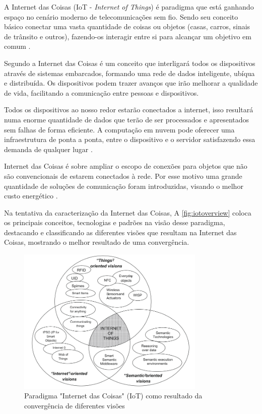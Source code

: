 A Internet das Coisas (IoT - \textit{Internet of Things}) é paradigma que está ganhando espaço no cenário moderno de telecomunicações sem fio. Sendo seu conceito básico conectar uma vasta quantidade de coisas ou objetos (casas, carros, sinais de trânsito e outros), fazendo-os interagir entre si para alcançar um objetivo em comum \cite{atzori2010internet}.


Segundo \cite{xia:2012} a Internet das Coisas é um conceito que interligará todos os dispositivos através de sistemas embarcados, formando uma rede de dados inteligente, ubíqua e distribuída. Os dispositivos podem trazer avanços que irão melhorar a qualidade de vida, facilitando a comunicação entre pessoas e dispositivos.

Todos os dispositivos ao nosso redor estarão conectados a internet, isso resultará numa enorme quantidade de dados que terão de ser processados e apresentados sem falhas de forma eficiente. A computação em nuvem pode oferecer uma infraestrutura de ponta a ponta, entre o dispositivo e o servidor satisfazendo essa demanda de qualquer lugar \cite{Gubbi:2013}.

Internet das Coisas é sobre ampliar o escopo de conexões para objetos que não são convencionais de estarem conectados à rede. Por esse motivo uma grande quantidade de soluções de comunicação foram introduzidas, visando o melhor custo energético \cite{siekkinen2012low}. 

Na tentativa da caracterização da Internet das Coisas, A \autoref{fig:iotoverview} coloca os principais conceitos, tecnologias e padrões na visão desse paradigma, destacando e classificando as diferentes visões que resultam na Internet das Coisas, mostrando o melhor resultado de uma convergência.

 \begin{figure}[H]
	\centering
    	\caption{\label{fig:iotoverview} Paradigma "Internet das Coisas" (IoT) como resultado da convergência de diferentes visões }
		\includegraphics[width = 0.8\textwidth]	{resources/iotoverview}
\end{figure}


